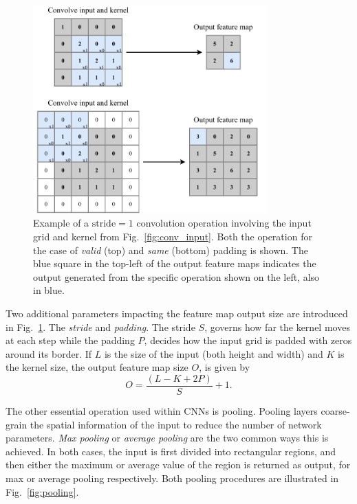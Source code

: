 \begin{figure} %
    \includegraphics[width=0.8\textwidth]{diagrams/6-cnn/conv_operation.pdf}
    \caption[Example of a convolution operation]
    {Example of a $\text{stride}=1$ convolution operation involving the input grid and kernel from
        Fig.~\ref{fig:conv_input}. Both the operation for the case of \emph{valid} (top) and
        \emph{same} (bottom) padding is shown. The blue square in the top-left of the output
        feature maps indicates the output generated from the specific operation shown on the left,
        also in blue.}
    \label{fig:conv_operation}
\end{figure}

Two additional parameters impacting the feature map output size are introduced in
Fig.~\ref{fig:conv_operation}. The \emph{stride} and \emph{padding}. The stride $S$, governs how
far the kernel moves at each step while the padding $P$, decides how the input grid is padded with
zeros around its border. If $L$ is the size of the input (both height and width) and $K$ is the
kernel size, the output feature map size $O$, is given by
\begin{equation}
    O=\frac{(L-K+2P)}{S}+1.
    \label{eq:conv_size}
\end{equation}

The other essential operation used within CNNs is pooling. Pooling layers coarse-grain the spatial
information of the input to reduce the number of network parameters. \emph{Max pooling} or
\emph{average pooling} are the two common ways this is achieved. In both cases, the input is first
divided into rectangular regions, and then either the maximum or average value of the region is
returned as output, for max or average pooling respectively. Both pooling procedures are
illustrated in Fig.~\ref{fig:pooling}.

